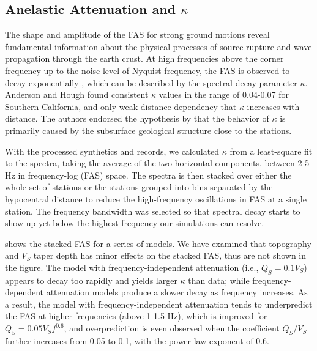 \subsection{Anelastic Attenuation and $\kappa$}
The shape and amplitude of the FAS for strong ground motions reveal fundamental information about the physical processes of source rupture and wave propagation through the earth crust. At high frequencies above the corner frequency up to the noise level of Nyquist frequency, the FAS is observed to decay exponentially \citep{anderson1984model}, which can be described by the spectral decay parameter $\kappa$. Anderson and Hough found consistent $\kappa$ values in the range of 0.04-0.07 for Southern California, and only weak distance dependency that $\kappa$ increases with distance. The authors endorsed the hypothesis by \citet{hanksFmax1982} that the behavior of $\kappa$ is primarily caused by the subsurface geological structure close to the stations.

With the processed synthetics and records, we calculated $\kappa$ from a least-square fit to the spectra, taking the average of the two horizontal components, between 2-5 Hz in frequency-log (FAS) space. The spectra is then stacked over either the whole set of stations or the stations grouped into bins separated by the hypocentral distance to reduce the high-frequency oscillations in FAS at a single station. The frequency bandwidth was selected so that spectral decay starts to show up yet below the highest frequency our simulations can resolve.

 shows the stacked FAS for a series of models. We have examined that topography and $V_S$ taper depth has minor effects on the stacked FAS, thus are not shown in the figure. The model with frequency-independent attenuation (i.e., $Q_S=0.1V_S$) appears to decay too rapidly and yields larger $\kappa$ than data; while frequency-dependent attenuation models produce a slower decay as frequency increases. As a result, the model with frequency-independent attenuation tends to underpredict the FAS at higher frequencies (above 1-1.5 Hz), which is improved for $Q_S=0.05V_Sf^{0.6}$, and overprediction is even observed when the coefficient $Q_S/V_S$ further increases from 0.05 to 0.1, with the power-law exponent of 0.6.

